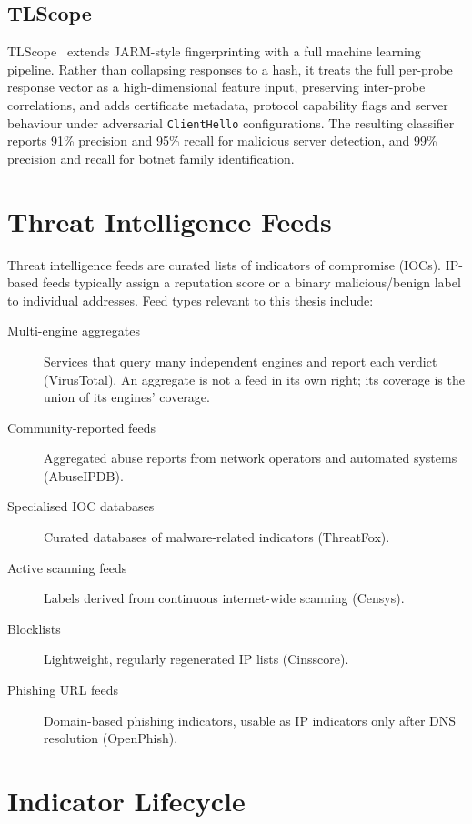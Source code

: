 \subsection{TLScope}

TLScope~\cite{theofanous2024tlscope} extends JARM-style fingerprinting with a full machine learning
pipeline. Rather than collapsing responses to a hash, it treats the full per-probe response vector
as a high-dimensional feature input, preserving inter-probe correlations, and adds certificate
metadata, protocol capability flags and server behaviour under adversarial \texttt{ClientHello}
configurations. The resulting classifier reports 91\% precision and 95\% recall for malicious
server detection, and 99\% precision and recall for botnet family identification.

\section{Threat Intelligence Feeds}

Threat intelligence feeds are curated lists of indicators of compromise (IOCs). IP-based feeds
typically assign a reputation score or a binary malicious/benign label to individual addresses.
Feed types relevant to this thesis include:

\begin{description}
  \item[Multi-engine aggregates] Services that query many independent engines and report each
    verdict (VirusTotal). An aggregate is not a feed in its own right; its coverage is the union
    of its engines' coverage.
  \item[Community-reported feeds] Aggregated abuse reports from network operators and automated
    systems (AbuseIPDB).
  \item[Specialised IOC databases] Curated databases of malware-related indicators (ThreatFox).
  \item[Active scanning feeds] Labels derived from continuous internet-wide scanning (Censys).
  \item[Blocklists] Lightweight, regularly regenerated IP lists (Cinsscore).
  \item[Phishing URL feeds] Domain-based phishing indicators, usable as IP indicators only after
    DNS resolution (OpenPhish).
\end{description}

\section{Indicator Lifecycle}
\label{sec:lifecycle}

